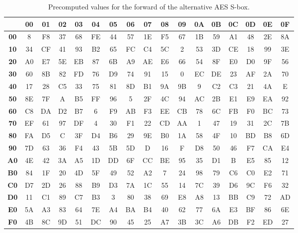 \vspace{1cm}

\begin{table}[ht!]
\begin{center}
\caption{Precomputed values for the forward of the alternative AES S-box.}
\label{tab:aesAltFullForward}
    \begin{tabular}{|c|c|c|c|c|c|c|c|c|c|c|c|c|c|c|c|c|} \hline
    ~ & \textbf{00} & \textbf{01} & \textbf{02} & \textbf{03} & \textbf{04} & \textbf{05} & \textbf{06} & \textbf{07} & \textbf{08} & \textbf{09} & \textbf{0A} & \textbf{0B} & \textbf{0C} & \textbf{0D} & \textbf{0E} & \textbf{0F} \\ \hline
\textbf{00} & 8 & F8 & 37 & 68 & FE & 44 & 57 & 1E & F5 & 67 & 1B & 59 & A1 & 48 & 2E & 8A \\
\textbf{10} & 34 & CF & 41 & 93 & B2 & 65 & FC & C4 & 5C & 2 & 53 & 3D & CE & 18 & 99 & 3E \\ 
\textbf{20} & A0 & E7 & 5E & EB & 87 & 6B & A9 & AE & E6 & 66 & 54 & 8F & E0 & D0 & 9F & 56 \\
\textbf{30} & 60 & 8B & 82 & FD & 76 & D9 & 74 & 91 & 15 & 0 & EC & DE & 23 & AF & 2A & 70 \\ 
\textbf{40} & 17 & 28 & C5 & 33 & 75 & 81 & 8D & B1 & 9A & 9B & 9 & C2 & C3 & 21 & 4A & E \\ 
\textbf{50} & 8E & 7F & A & B5 & FF & 96 & 5 & 2F & 4C & 94 & AC & 2B & E1 & E9 & EA & 92 \\ 
\textbf{60} & C8 & DA & D2 & B7 & 6 & F9 & AB & F3 & EE & CB & 78 & 6C & FB & F0 & BC & 73 \\ 
\textbf{70} & EF & 61 & 97 & DF & 4 & 30 & F1 & 22 & CD & AA & 1 & 47 & 19 & 31 & 2C & 7B \\ 
\textbf{80} & FA & D5 & C & 3F & D4 & B6 & 29 & 9E & B0 & 1A & 58 & 4F & 10 & BD & B8 & 6D \\ 
\textbf{90} & 7D & 63 & 36 & F4 & 43 & 5B & 5D & D & 16 & F & D8 & 50 & 46 & F7 & CA & E4 \\ 
\textbf{A0} & 4E & 42 & 3A & A5 & 1D & DD & 6F & CC & BE & 95 & 35 & D1 & B & E5 & 85 & 12 \\ 
\textbf{B0} & 84 & 1F & 20 & 4D & 5F & 49 & 52 & A2 & 7 & 24 & 98 & 79 & C6 & C0 & E2 & 71 \\ 
\textbf{C0} & D7 & 2D & 26 & 88 & B9 & D3 & 7A & 1C & 55 & 14 & 7C & 39 & D6 & 9C & F6 & 32 \\ 
\textbf{D0} & 11 & C1 & 89 & C7 & B3 & 3 & 80 & 38 & 69 & E8 & A8 & 13 & BB & C9 & 72 & AD \\ 
\textbf{E0} & 5A & A3 & 83 & 64 & 7E & A4 & BA & B4 & 40 & 62 & 77 & 6A & E3 & BF & 86 & 6E \\ 
\textbf{F0} & 4B & 8C & 9D & 51 & DC & 90 & 45 & 25 & A7 & 3B & 3C & A6 & DB & F2 & ED & 27 \\ \hline
    \end{tabular}
\end{center}
\end{table}

